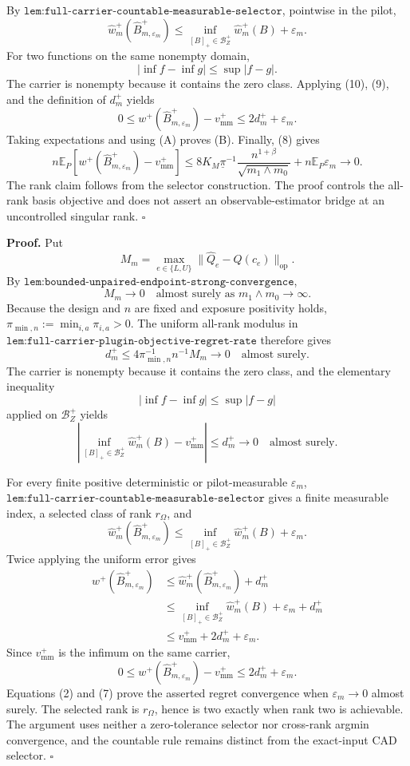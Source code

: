By \(\texttt{lem:full-carrier-countable-measurable-selector}\), pointwise in the pilot,
\[
\widehat w_m^+(\widehat B_{m,\varepsilon_m}^+)
\le\inf_{[B]_+\in\mathcal B_Z^+}\widehat w_m^+(B)+\varepsilon_m.
\tag{9}
\]
For two functions on the same nonempty domain,
\[
|\inf f-\inf g|\le\sup|f-g|.
\tag{10}
\]
The carrier is nonempty because it contains the zero class.  Applying (10), (9), and the definition of \(d_m^+\) yields
\[
0\le w^+(\widehat B_{m,\varepsilon_m}^+)-v_{\mathrm{mm}}^+
\le2d_m^++\varepsilon_m.
\tag{11}
\]
Taking expectations and using (A) proves (B).  Finally, (8) gives
\[
n\mathbb E_P\!\left[w^+(\widehat B_{m,\varepsilon_m}^+)-v_{\mathrm{mm}}^+\right]
\le8K_M\underline\pi^{-1}\frac{n^{1+\beta}}{\sqrt{m_1\wedge m_0}}
+n\mathbb E_P\varepsilon_m\longrightarrow0.
\tag{12}
\]
The rank claim follows from the selector construction.  The proof controls the all-rank basis objective and does not assert an observable-estimator bridge at an uncontrolled singular rank. \(\square\)

\textbf{Proof.}
Put
\[
M_m=\max_{e\in\{L,U\}}\lVert\widehat Q_e-Q(c_e)\rVert_{\mathrm{op}}.
\]
By \(\texttt{lem:bounded-unpaired-endpoint-strong-convergence}\),
\[
M_m\longrightarrow0
\quad\text{almost surely as }m_1\wedge m_0\to\infty.
\tag{1}
\]
Because the design and \(n\) are fixed and exposure positivity holds,
\(\pi_{\min,n}:=\min_{i,a}\pi_{i,a}>0\).  The uniform all-rank modulus in \(\texttt{lem:full-carrier-plugin-objective-regret-rate}\) therefore gives
\[
d_m^+\le4\pi_{\min,n}^{-1}n^{-1}M_m\longrightarrow0
\quad\text{almost surely}.
\tag{2}
\]
The carrier is nonempty because it contains the zero class, and the elementary inequality
\[
|\inf f-\inf g|\le\sup|f-g|
\tag{3}
\]
applied on \(\mathcal B_Z^+\) yields
\[
\left|\inf_{[B]_+\in\mathcal B_Z^+}\widehat w_m^+(B)-v_{\mathrm{mm}}^+\right|
\le d_m^+\longrightarrow0
\quad\text{almost surely}.
\tag{4}
\]

For every finite positive deterministic or pilot-measurable \(\varepsilon_m\), \(\texttt{lem:full-carrier-countable-measurable-selector}\) gives a finite measurable index, a selected class of rank \(r_\Omega\), and
\[
\widehat w_m^+(\widehat B_{m,\varepsilon_m}^+)
\le\inf_{[B]_+\in\mathcal B_Z^+}\widehat w_m^+(B)+\varepsilon_m.
\tag{5}
\]
Twice applying the uniform error gives
\[
\begin{aligned}
w^+(\widehat B_{m,\varepsilon_m}^+)
&\le\widehat w_m^+(\widehat B_{m,\varepsilon_m}^+)+d_m^+\\
&\le\inf_{[B]_+\in\mathcal B_Z^+}\widehat w_m^+(B)+\varepsilon_m+d_m^+\\
&\le v_{\mathrm{mm}}^++2d_m^++\varepsilon_m.
\end{aligned}
\tag{6}
\]
Since \(v_{\mathrm{mm}}^+\) is the infimum on the same carrier,
\[
0\le w^+(\widehat B_{m,\varepsilon_m}^+)-v_{\mathrm{mm}}^+
\le2d_m^++\varepsilon_m.
\tag{7}
\]
Equations (2) and (7) prove the asserted regret convergence when \(\varepsilon_m\to0\) almost surely.  The selected rank is \(r_\Omega\), hence is two exactly when rank two is achievable.  The argument uses neither a zero-tolerance selector nor cross-rank argmin convergence, and the countable rule remains distinct from the exact-input CAD selector. \(\square\)

